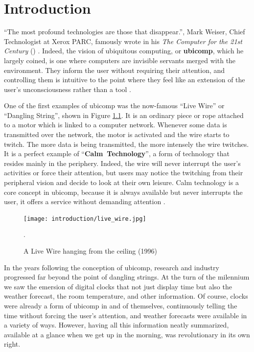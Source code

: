 \chapter{Introduction} \label{chap:intro}
``The most profound technologies are those that disappear.'', Mark Weiser, Chief Technologist at Xerox PARC, famously wrote in his \textit{The Computer for the 21st Century} (\citeyear{weiser1991computer}) \cite{weiser1991computer}. Indeed, the vision of ubiquitous computing, or \mbox{\textbf{ubicomp}}, which he largely coined, is one where computers are invisible servants merged with the environment. They inform the user without requiring their attention, and controlling them is intuitive to the point where they feel like an extension of the user's unconsciousness rather than a tool \cite{weiser1997coming}.

One of the first examples of ubicomp was the now-famous ``Live Wire'' or ``Dangling String'', shown in Figure \ref{fig:live_wire}. It is an ordinary piece or rope attached to a motor which is linked to a computer network. Whenever some data is transmitted over the network, the motor is activated and the wire starts to twitch. The more data is being transmitted, the more intensely the wire twitches. It is a perfect example of ``\mbox{\textbf{Calm Technology}}'', a form of technology that resides mainly in the periphery. Indeed, the wire will never interrupt the user's activities or force their attention, but users may notice the twitching from their peripheral vision and decide to look at their own leisure. Calm technology is a core concept in ubicomp, because it is always available but never interrupts the user, it offers a service without demanding attention \cite{weiser1996designing}.

\begin{figure}
    \centering
    \texttt{[image: introduction/live\_wire.jpg]}
    \caption{A Live Wire hanging from the ceiling (1996) \cite{weiser1996designing}}.
    \label{fig:live_wire}
\end{figure}

In the years following the conception of ubicomp, research and industry progressed far beyond the point of dangling strings. At the turn of the milennium we saw the emersion of digital clocks that not just display time but also the weather forecast, the room temperature, and other information. Of course, clocks were already a form of ubicomp in and of themselves, continuously telling the time without forcing the user's attention, and weather forecasts were available in a variety of ways. However, having all this information neatly summarized, available at a glance when we get up in the morning, was revolutionary in its own right.

